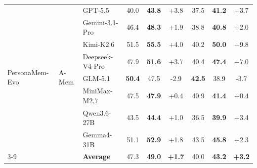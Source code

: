 \documentclass{article}
\begin{document}
\begin{table}[t]
{\begin{tabular}{lllcccccc}
\multirow{8}{*}{PersonaMem-Evo}
  & \multirow{8}{*}{A-Mem}
  & GPT-5.5 & 40.0 & \textbf{43.8} & \textcolor{green!50!black}{+3.8} & 37.5 & \textbf{41.2} & \textcolor{green!50!black}{+3.7} \\
  & & Gemini-3.1-Pro & 46.4 & \textbf{48.3} & \textcolor{green!50!black}{+1.9} & 38.8 & \textbf{40.8} & \textcolor{green!50!black}{+2.0} \\
  & & Kimi-K2.6 & 51.5 & \textbf{55.5} & \textcolor{green!50!black}{+4.0} & 40.2 & \textbf{50.0} & \textcolor{green!50!black}{+9.8} \\
  & & Deepseek-V4-Pro & 47.9 & \textbf{51.6} & \textcolor{green!50!black}{+3.7} & 40.4 & \textbf{47.4} & \textcolor{green!50!black}{+7.0} \\
  & & GLM-5.1 & \textbf{50.4} & 47.5 & \textcolor{red!50!black}{-2.9} & \textbf{42.5} & 38.9 & \textcolor{red!50!black}{-3.7} \\
  & & MiniMax-M2.7 & 47.5 & \textbf{47.9} & \textcolor{green!50!black}{+0.4} & 40.9 & \textbf{41.4} & \textcolor{green!50!black}{+0.4} \\
  & & Qwen3.6-27B & 43.5 & \textbf{44.4} & \textcolor{green!50!black}{+1.0} & 36.5 & \textbf{39.9} & \textcolor{green!50!black}{+3.4} \\
    & & Gemma4-31B & 51.1 & \textbf{52.9} & \textcolor{green!50!black}{+1.8} & 43.5 & \textbf{45.8} & \textcolor{green!50!black}{+2.3} \\
  \cmidrule(l){3-9}
  & & \textbf{Average} & 47.3 & \textbf{49.0} & \textcolor{green!50!black}{\textbf{+1.7}} & 40.0 & \textbf{43.2} & \textcolor{green!50!black}{\textbf{+3.2}} \\


\bottomrule
\end{tabular}
}
\vspace{-3mm}
\label{tab:main_results}
\end{table}
\end{document}
